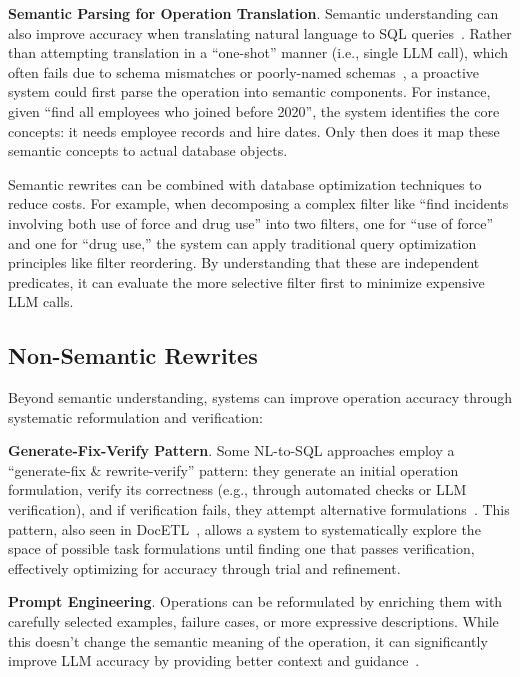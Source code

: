 \textbf{Semantic Parsing for Operation Translation}. Semantic understanding can also improve accuracy when translating natural language to SQL queries~\cite{pourreza2024chase}. Rather than attempting translation in a ``one-shot'' manner (i.e., single LLM call), which often fails due to schema mismatches or poorly-named schemas~\cite{luoma2025snails}, a proactive system could first parse the operation into semantic components. For instance, given ``find all employees who joined before 2020'', the system identifies the core concepts: it needs employee records and hire dates. Only then does it map these semantic concepts to actual database objects.

Semantic rewrites can be combined with database optimization techniques to reduce costs. For example, when decomposing a complex filter like ``find incidents involving both use of force and drug use'' into two filters, one for ``use of force'' and one for ``drug use,'' the system can apply traditional query optimization principles like filter reordering. By understanding that these are independent predicates, it can evaluate the more selective filter first to minimize expensive LLM calls. 

\subsection{Non-Semantic Rewrites}

Beyond semantic understanding, systems can improve operation accuracy through systematic reformulation and verification:

\textbf{Generate-Fix-Verify Pattern}. Some NL-to-SQL approaches employ a ``generate-fix \& rewrite-verify'' pattern: they generate an initial operation formulation, verify its correctness (e.g., through automated checks or LLM verification), and if verification fails, they attempt alternative formulations~\cite{chung2025long}. This pattern, also seen in DocETL~\cite{shankar2024docetl}, allows a system to systematically explore the space of possible task formulations until finding one that passes verification, effectively optimizing for accuracy through trial and refinement.

\textbf{Prompt Engineering}. Operations can be reformulated by enriching them with carefully selected examples, failure cases, or more expressive descriptions. While this doesn't change the semantic meaning of the operation, it can significantly improve LLM accuracy by providing better context and guidance~\cite{khattab2023dspy}.

